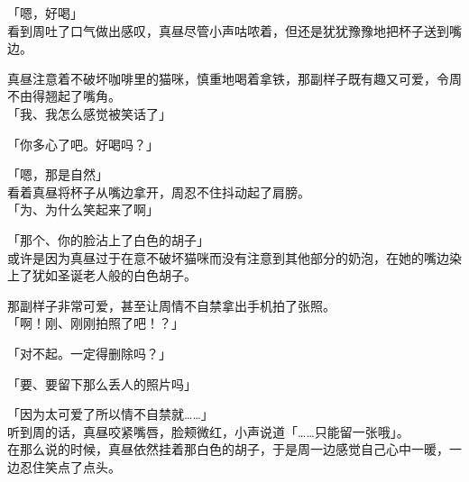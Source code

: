 「嗯，好喝」\\

看到周吐了口气做出感叹，真昼尽管小声咕哝着，但还是犹犹豫豫地把杯子送到嘴边。

真昼注意着不破坏咖啡里的猫咪，慎重地喝着拿铁，那副样子既有趣又可爱，令周不由得翘起了嘴角。\\

「我、我怎么感觉被笑话了」

「你多心了吧。好喝吗？」

「嗯，那是自然」\\

看着真昼将杯子从嘴边拿开，周忍不住抖动起了肩膀。\\

「为、为什么笑起来了啊」

「那个、你的脸沾上了白色的胡子」\\

或许是因为真昼过于在意不破坏猫咪而没有注意到其他部分的奶泡，在她的嘴边染上了犹如圣诞老人般的白色胡子。

那副样子非常可爱，甚至让周情不自禁拿出手机拍了张照。\\

「啊！刚、刚刚拍照了吧！？」

「对不起。一定得删除吗？」

「要、要留下那么丢人的照片吗」

「因为太可爱了所以情不自禁就……」\\

听到周的话，真昼咬紧嘴唇，脸颊微红，小声说道「……只能留一张哦」。\\

在那么说的时候，真昼依然挂着那白色的胡子，于是周一边感觉自己心中一暖，一边忍住笑点了点头。
